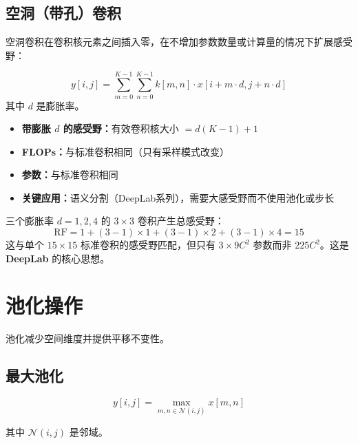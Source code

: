 \subsection{空洞（带孔）卷积}

空洞卷积在卷积核元素之间插入零，在不增加参数数量或计算量的情况下扩展感受野：

\begin{equation}
y[i,j] = \sum_{m=0}^{K-1}\sum_{n=0}^{K-1} k[m,n] \cdot x[i + m \cdot d, j + n \cdot d]
\end{equation}
其中 $d$ 是膨胀率。

\begin{properties}[空洞卷积特性]
\begin{itemize}
    \item \textbf{带膨胀 $d$ 的感受野：}有效卷积核大小 $= d(K - 1) + 1$
    \item \textbf{FLOPs：}与标准卷积相同（只有采样模式改变）
    \item \textbf{参数：}与标准卷积相同
    \item \textbf{关键应用：}语义分割（DeepLab系列），需要大感受野而不使用池化或步长
\end{itemize}
\end{properties}

\begin{example}[堆叠空洞卷积]
三个膨胀率 $d = 1, 2, 4$ 的 $3 \times 3$ 卷积产生总感受野：
\begin{equation}
\text{RF} = 1 + (3-1)\times1 + (3-1)\times2 + (3-1)\times4 = 15
\end{equation}
这与单个 $15 \times 15$ 标准卷积的感受野匹配，但只有 $3 \times 9C^2$ 参数而非 $225C^2$。这是\textbf{DeepLab} \cite{chen2017deeplab} 的核心思想。
\end{example}

\section{池化操作}

池化减少空间维度并提供平移不变性。

\subsection{最大池化}

\begin{equation}
y[i,j] = \max_{m,n \in \mathcal{N}(i,j)} x[m,n]
\end{equation}

其中 $\mathcal{N}(i,j)$ 是邻域。

